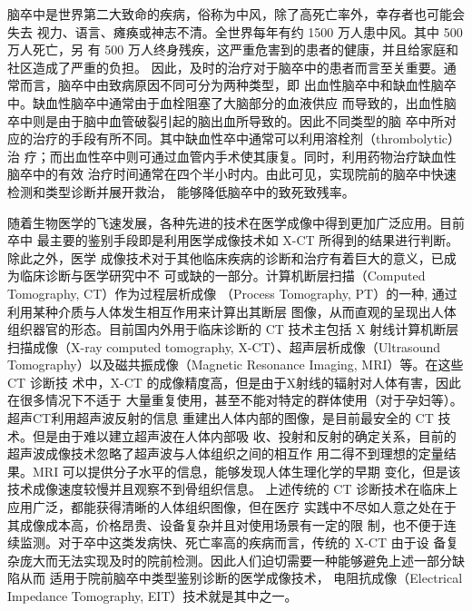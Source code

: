 


脑卒中是世界第二大致命的疾病，俗称为中风，除了高死亡率外，幸存者也可能会失去
视力、语言、瘫痪或神志不清。全世界每年有约 1500 万人患中风。其中 500 万人死亡，另
有 500 万人终身残疾，这严重危害到的患者的健康，并且给家庭和社区造成了严重的负担。
因此，及时的治疗对于脑卒中的患者而言至关重要。通常而言，脑卒中由致病原因不同可分为两种类型，即
出血性脑卒中和缺血性脑卒中。缺血性脑卒中通常由于血栓阻塞了大脑部分的血液供应
而导致的，出血性脑卒中则是由于脑中血管破裂引起的脑出血所导致的。因此不同类型的脑
卒中所对应的治疗的手段有所不同。其中缺血性卒中通常可以利用溶栓剂（thrombolytic）治
疗；而出血性卒中则可通过血管内手术使其康复。同时，利用药物治疗缺血性脑卒中的有效
治疗时间通常在四个半小时内。由此可见，实现院前的脑卒中快速检测和类型诊断并展开救治，
能够降低脑卒中的致死致残率。

随着生物医学的飞速发展，各种先进的技术在医学成像中得到更加广泛应用。目前卒中
最主要的鉴别手段即是利用医学成像技术如 X-CT 所得到的结果进行判断。除此之外，医学
成像技术对于其他临床疾病的诊断和治疗有着巨大的意义，已成为临床诊断与医学研究中不
可或缺的一部分。计算机断层扫描（Computed Tomography, CT）作为过程层析成像
（Process Tomography, PT）的一种, 通过利用某种介质与人体发生相互作用来计算出其断层
图像，从而直观的呈现出人体组织器官的形态。目前国内外用于临床诊断的 CT 技术主包括
X 射线计算机断层扫描成像（X-ray computed tomography, X-CT）、超声层析成像（Ultrasound
Tomography）以及磁共振成像（Magnetic Resonance Imaging, MRI）等。在这些 CT 诊断技
术中，X-CT 的成像精度高，但是由于X射线的辐射对人体有害，因此在很多情况下不适于
大量重复使用，甚至不能对特定的群体使用（对于孕妇等）。超声CT利用超声波反射的信息
重建出人体内部的图像，是目前最安全的 CT 技术。但是由于难以建立超声波在人体内部吸
收、投射和反射的确定关系，目前的超声波成像技术忽略了超声波与人体组织之间的相互作
用二得不到理想的定量结果。MRI 可以提供分子水平的信息，能够发现人体生理化学的早期
变化，但是该技术成像速度较慢并且观察不到骨组织信息。
上述传统的 CT 诊断技术在临床上应用广泛，都能获得清晰的人体组织图像，但在医疗
实践中不尽如人意之处在于其成像成本高，价格昂贵、设备复杂并且对使用场景有一定的限
制，也不便于连续监测。对于卒中这类发病快、死亡率高的疾病而言，传统的 X-CT 由于设
备复杂庞大而无法实现及时的院前检测。因此人们迫切需要一种能够避免上述一部分缺陷从而
适用于院前脑卒中类型鉴别诊断的医学成像技术，
电阻抗成像（Electrical Impedance Tomography, EIT）技术就是其中之一。

